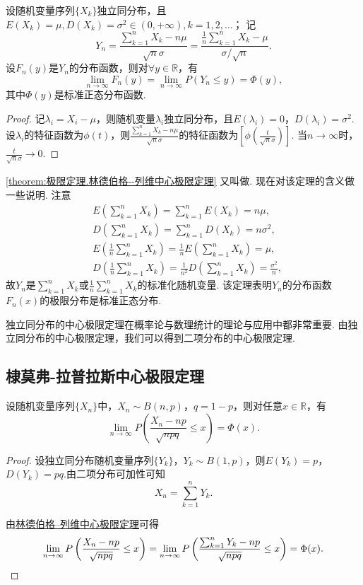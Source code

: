 \begin{theorem}\label{theorem:极限定理.林德伯格--列维中心极限定理}
设随机变量序列\(\{X_k\}\)独立同分布，且\(E(X_k)=\mu, D(X_k)=\sigma^2\in(0,+\infty), k=1,2,\dotsc\)；
记\[
Y_n = \frac{\sum_{k=1}^n X_k - n\mu}{\sqrt{n} \sigma}
= \frac{ \frac{1}{n} \sum_{k=1}^n X_k - \mu}{\sigma / \sqrt{n}}.
\]设\(F_n(y)\)是\(Y_n\)的分布函数，则对\(\forall y \in \mathbb{R}\)，有\[
\lim_{n\to\infty} F_n(y)
= \lim_{n\to\infty} P(Y_n \leq y) = \Phi(y),
\]其中\(\Phi(y)\)是标准正态分布函数.
\begin{proof}
记\(\lambda_i = X_i-\mu\)，则随机变量\(\lambda_i\)独立同分布，且\(E(\lambda_i)=0\)，\(D(\lambda_i)=\sigma^2\).
设\(\lambda_i\)的特征函数为\(\phi(t)\)，则\(\frac{\sum_{k=1}^n X_k - n\mu}{\sqrt{n} \sigma}\)的特征函数为\(\left[\phi\left(\frac{t}{\sqrt{n}\sigma}\right)\right]\).
当\(n\to\infty\)时，\(\frac{t}{\sqrt{n}\sigma}\to0\).
\end{proof}
\end{theorem}

\cref{theorem:极限定理.林德伯格--列维中心极限定理} 又叫做.
现在对该定理的含义做一些说明.
注意\begin{align*}
&E\left(\sum_{k=1}^n X_k\right) = \sum_{k=1}^n E(X_k) = n\mu, \\
&D\left(\sum_{k=1}^n X_k\right) = \sum_{k=1}^n D(X_k) = n\sigma^2, \\
&E\left(\frac{1}{n} \sum_{k=1}^n X_k\right)
= \frac{1}{n} E\left(\sum_{k=1}^n X_k\right)
= \mu, \\
&D\left(\frac{1}{n} \sum_{k=1}^n X_k\right)
= \frac{1}{n^2} D\left(\sum_{k=1}^n X_k\right)
= \frac{\sigma^2}{n},
\end{align*}
故\(Y_n\)是\(\sum_{k=1}^n X_k\)或\(\frac{1}{n} \sum_{k=1}^n X_k\)的标准化随机变量.
该定理表明\(Y_n\)的分布函数\(F_n(x)\)的极限分布是标准正态分布.

独立同分布的中心极限定理在概率论与数理统计的理论与应用中都非常重要.
由独立同分布的中心极限定理，我们可以得到二项分布的中心极限定理.
\subsection{棣莫弗-拉普拉斯中心极限定理}
\begin{theorem}\label{theorem:极限定理.棣莫弗-拉普拉斯中心极限定理}
设随机变量序列\(\{X_n\}\)中，\(X_n \sim B(n,p)\)，\(q = 1-p\)，则对任意\(x \in \mathbb{R}\)，有\[
\lim_{n\to\infty} P\left( \frac{X_n - np}{\sqrt{npq}} \leq x \right) = \Phi(x).
\]
\begin{proof}
设独立同分布随机变量序列\(\{Y_k\}\)，\(Y_k \sim B(1,p)\)，则\(E(Y_k)=p\)，\(D(Y_k)=pq\).由二项分布可加性可知\[
X_n = \sum_{k=1}^n{Y_k}.
\]

由\hyperref[theorem:极限定理.林德伯格--列维中心极限定理]{林德伯格--列维中心极限定理}可得\[
\lim_{n\to\infty} P\left(\frac{X_n-np}{\sqrt{npq}} \leq x\right)
= \lim_{n\to\infty} P\left(\frac{\sum_{k=1}^n{Y_k}-np}{\sqrt{npq}} \leq x\right)
= \Phi(x).
\qedhere
\]
\end{proof}
\end{theorem}

